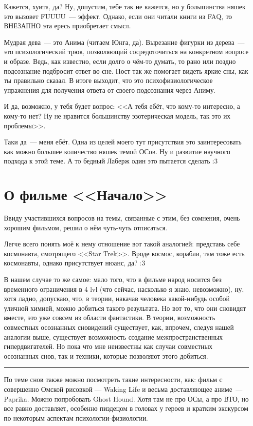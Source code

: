 \documentclass[a4paper,14pt,oneside]{memoir}
\begin{document}
Кажется, хуита, да? Ну, допустим, тебе так не кажется, но у большинства няшек это вызовет FUUUU~--- эффект. Однако, если они читали книги из FAQ, то ВНЕЗАПНО эта ересь приобретает смысл. 

Мудрая дева~--- это Анима (читаем Юнга, да). Вырезание фигурки из дерева~--- это психологический трюк, позволяющий сосредоточиться на конкретном вопросе и образе. Ведь, как известно, если долго о чём-то думать, то рано или поздно подсознание подбросит ответ во сне. Пост так же помогает видеть яркие сны, как ты правильно сказал. В итоге выходит, что это психофизиологическое упражнения для получения ответа от своего подсознания через Аниму. 

И да, возможно, у тебя будет вопрос: <<А тебя ебёт, что кому-то интересно, а кому-то нет? Ну не нравится большинству эзотерическая модель, так это их проблемы>>.
 
Таки да~--- меня ебёт. Одна из целей моего тут присутствия это заинтересовать как можно большее количество няшек темой ОСов. Ну и развитие научного подхода к этой теме. А то бедный Лаберж один это пытается сделать :3 




\section{О фильме <<Начало>>}
Ввиду участившихся вопросов на темы, связанные с этим, без сомнения, очень хорошим фильмом, решил о нём чуть-чуть отписаться. 

Легче всего понять моё к нему отношение вот такой аналогией: представь себе космонавта, смотрящего <<Star Trek>>. Вроде космос, корабли, там тоже есть космонавты, однако присутствует нюанс, да? :3 

В нашем случае то же самое: мало того, что в фильме народ носится без временного ограничения в 4 lvl (что сейчас, насколько я знаю, невозможно), ну, хотя ладно, допускаю, что, в теории, накачав человека какой-нибудь особой уличной химией, можно добиться такого результата. Но вот то, что они сновидят вместе, это уже совсем из области фантастики. В теории, возможность совместных осознанных сновидений существует, как, впрочем, следуя нашей аналогии выше, существует возможность создание межпространственных гипердвигателей. Но пока что мне неизвестны как случаи совместных осознанных снов, так и техники, которые позволяют этого добиться. 

\smallskip
\fancybreak{* * *}

По теме снов также можно посмотреть такие интересности, как: фильм с совершенно Омской рисовкой — Waking Life и весьма доставляющее аниме~--- Paprika. Можно попробовать Ghost Hound. Хотя там не про ОСы, а про ВТО, но все равно доставляет, особенно пиздецом в головах у героев и кратким экскурсом по некоторым аспектам психологии-физиологии.
\end{document}
